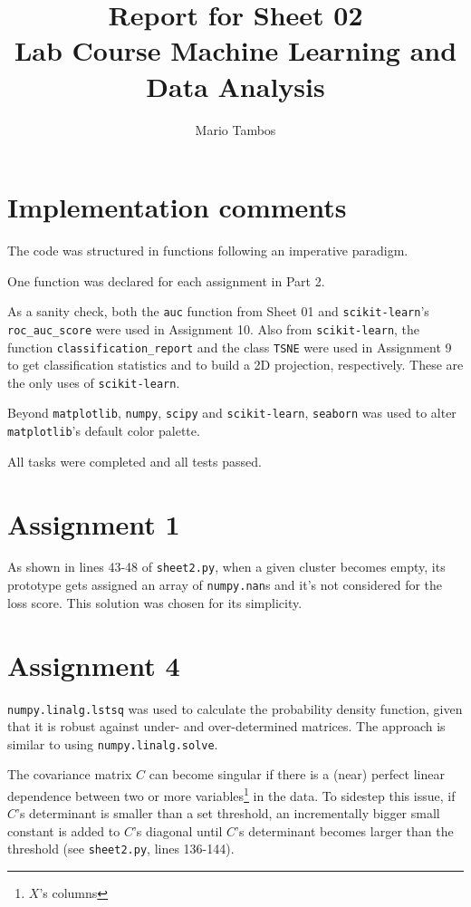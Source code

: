 \documentclass[a4paper,11pt]{article}
\begin{document}
\author{Mario Tambos}
\title{\vspace{-2cm}Report for Sheet 02\\
\small{Lab Course Machine Learning and Data Analysis}}
\maketitle

\section*{Implementation comments}
The code was structured in functions following an imperative paradigm.

One function was declared for each assignment in Part 2.

As a sanity check, both the \verb|auc| function from Sheet 01 and \verb|scikit-learn|'s \verb|roc_auc_score| were used in Assignment 10. Also from \verb|scikit-learn|, the function \verb|classification_report| and the class \verb|TSNE| were used in Assignment 9 to get classification statistics and to build a 2D projection, respectively. These are the only uses of \verb|scikit-learn|.

Beyond \verb|matplotlib|, \verb|numpy|, \verb|scipy| and \verb|scikit-learn|, \verb|seaborn| was used to alter \verb|matplotlib|'s default color palette.

All tasks were completed and all tests passed.

\section*{Assignment 1}
As shown in lines 43-48 of \verb|sheet2.py|, when a given cluster becomes empty, its prototype gets assigned an array of \verb|numpy.nan|s and it's not considered for the loss score. This solution was chosen for its simplicity.

\section*{Assignment 4}
\verb|numpy.linalg.lstsq| was used to calculate the probability density function, given that it is robust against under- and over-determined matrices. The approach is similar to using \verb|numpy.linalg.solve|.

The covariance matrix $C$ can become singular if there is a (near) perfect linear dependence between two or more variables\footnote{$X$'s columns} in the data. To sidestep this issue, if $C$'s determinant is smaller than a set threshold, an incrementally bigger small constant is added to $C$'s diagonal until $C$'s determinant becomes larger than the threshold (see \verb|sheet2.py|, lines 136-144).
\end{document}
